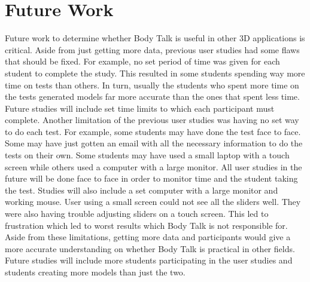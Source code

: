 \documentclass[journal]{vgtc}                %
\begin{document}
\noindent

\section{Future Work}

\noindent Future work to determine whether Body Talk is useful in other 3D applications is critical. Aside from just getting more data,
previous user studies had some flaws that should be fixed.
\newline \newline
\noindent For example, no set period of time was given for each student to complete the study. This resulted in some students spending
way more time on tests than others. In turn, usually the students who spent more time on the tests generated models far more accurate
than the ones that spent less time. Future studies will include set time limits to which each participant must complete.
\newline\newline
\noindent Another limitation of the previous user studies was having no set way to do each test. For example, some students may have
done the test face to face. Some may have just gotten an email with all the necessary information to do the tests on their own. Some
students may have used a small laptop with a touch screen while others used a computer with a large monitor. All user studies in the
future will be done face to face in order to monitor time and the student taking the test. Studies will also include a set computer with
a large monitor and working mouse. User using a small screen could not see all the sliders well. They were also having trouble adjusting
sliders on a touch screen. This led to frustration which led to worst results which Body Talk is not responsible for.
\newline\newline
\noindent Aside from these limitations, getting more data and participants would give a more accurate understanding on whether Body Talk
is practical in other fields. Future studies will include more students participating in the user studies and students creating more
models than just the two.
\end{document}
